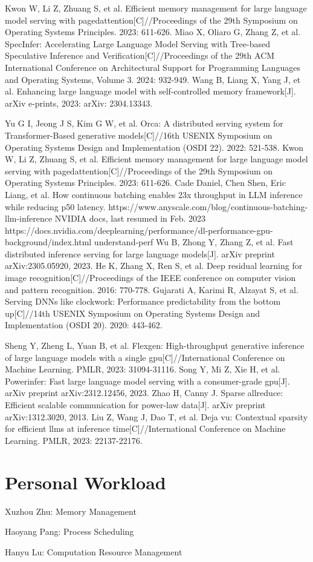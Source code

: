 \documentclass[conference]{IEEEtran}
\begin{document}
\begin{thebibliography}{00}
     Kwon W, Li Z, Zhuang S, et al. Efficient memory management for large language model serving with pagedattention[C]//Proceedings of the 29th Symposium on Operating Systems Principles. 2023: 611-626.
     Miao X, Oliaro G, Zhang Z, et al. SpecInfer: Accelerating Large Language Model Serving with Tree-based Speculative Inference and Verification[C]//Proceedings of the 29th ACM International Conference on Architectural Support for Programming Languages and Operating Systems, Volume 3. 2024: 932-949.
     Wang B, Liang X, Yang J, et al. Enhancing large language model with self-controlled memory framework[J]. arXiv e-prints, 2023: arXiv: 2304.13343.

     Yu G I, Jeong J S, Kim G W, et al. Orca: A distributed serving system for Transformer-Based generative models[C]//16th USENIX Symposium on Operating Systems Design and Implementation (OSDI 22). 2022: 521-538.
     Kwon W, Li Z, Zhuang S, et al. Efficient memory management for large language model serving with pagedattention[C]//Proceedings of the 29th Symposium on Operating Systems Principles. 2023: 611-626.
     Cade Daniel, Chen Shen, Eric Liang, et al.  How continuous batching enables 23x throughput in LLM inference while reducing p50 latency. https://www.anyscale.com/blog/continuous-batching-llm-inference
     NVIDIA docs, last resumed in Feb. 2023 https://docs.nvidia.com/deeplearning/performance/dl-performance-gpu-background/index.html understand-perf
     Wu B, Zhong Y, Zhang Z, et al. Fast distributed inference serving for large language models[J]. arXiv preprint arXiv:2305.05920, 2023.
     He K, Zhang X, Ren S, et al. Deep residual learning for image recognition[C]//Proceedings of the IEEE conference on computer vision and pattern recognition. 2016: 770-778.
     Gujarati A, Karimi R, Alzayat S, et al. Serving DNNs like clockwork: Performance predictability from the bottom up[C]//14th USENIX Symposium on Operating Systems Design and Implementation (OSDI 20). 2020: 443-462.

    Sheng Y, Zheng L, Yuan B, et al. Flexgen: High-throughput generative inference of large language models with a single gpu[C]//International Conference on Machine Learning. PMLR, 2023: 31094-31116.
    Song Y, Mi Z, Xie H, et al. Powerinfer: Fast large language model serving with a consumer-grade gpu[J]. arXiv preprint arXiv:2312.12456, 2023.
    Zhao H, Canny J. Sparse allreduce: Efficient scalable communication for power-law data[J]. arXiv preprint arXiv:1312.3020, 2013.
    Liu Z, Wang J, Dao T, et al. Deja vu: Contextual sparsity for efficient llms at inference time[C]//International Conference on Machine Learning. PMLR, 2023: 22137-22176.
\end{thebibliography}

\section*{Personal Workload}
Xuzhou Zhu: Memory Management

Haoyang Pang: Process Scheduling

Hanyu Lu: Computation Resource Management

\vspace{12pt}
\end{document}

